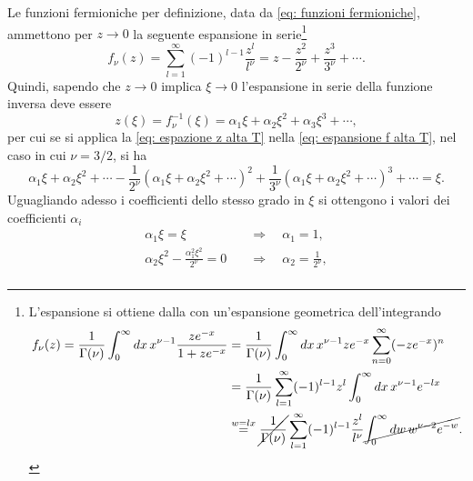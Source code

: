 \setcounter{caso}{0}
\begin{caso}
    Le funzioni fermioniche per definizione, data da \eqref{eq: funzioni fermioniche}, ammettono per $z \to 0$ la seguente espansione in serie\footnote{L'espansione si ottiene dalla con un'espansione geometrica dell'integrando 
    \begin{equation}
        \begin{split}
            f_\nu(z) = \frac{1}{\Gamma(\nu)}\int_0^\infty dx\,x^{\nu -1} \frac{ze^{-x}}{1 + ze^{-x}} &= \frac{1}{\Gamma(\nu)}\int_0^\infty dx\,x^{\nu -1}ze^{-x}\sum_{n=0}^\infty(-ze^{-x})^n \\
            &= \frac{1}{\Gamma(\nu)}\sum_{l=1}^\infty(-1)^{l-1}z^l\int_0^\infty dx\,x^{\nu-1}e^{-lx} \\
            &\overset{w = lx}{=} \cancel{\frac{1}{\Gamma(\nu)} }\sum_{l=1}^\infty(-1)^{l-1}\frac{z^l}{l^\nu}\cancel{\int_0^\infty dw\,w^{\nu - 2}e^{-w}}.
        \end{split}
    \end{equation}
    }
    \begin{equation}
    \label{eq: espansione f alta T}
        f_\nu(z) = \sum_{l = 1}^\infty(-1)^{l-1}\frac{z^l}{l^\nu} = z - \frac{z^2}{2^\nu} + \frac{z^3}{3^\nu} + \cdots.
    \end{equation}
    Quindi, sapendo che $z \to 0$ implica $\xi \to 0$ l'espansione in serie della funzione inversa deve essere
    \begin{equation}
    \label{eq: espazione z alta T}
        z(\xi) = f_\nu^{-1}(\xi) = \alpha_1 \xi + \alpha_2\xi^2 + \alpha_3 \xi^3 + \cdots,
    \end{equation}
    per cui se si applica la \eqref{eq: espazione z alta T} nella \eqref{eq: espansione f alta T}, nel caso in cui $\nu = 3/2$, si ha
    \begin{equation}
        \alpha_1 \xi + \alpha_2\xi^2  + \cdots - \frac{1}{2^\nu}(\alpha_1\xi + \alpha_2\xi^2 + \cdots)^2 + \frac{1}{3^\nu}(\alpha_1\xi + \alpha_2\xi^2 + \cdots)^3 + \cdots = \xi.
    \end{equation}
    Uguagliando adesso i coefficienti dello stesso grado in $\xi$ si ottengono i valori dei coefficienti $\alpha_i$
    \begin{align}
        \alpha_1\xi = \xi\quad&\Longrightarrow\quad \alpha_1 = 1, \\
        \alpha_2\xi^2 - \frac{\alpha_1^2\xi^2}{2^\nu} = 0\quad&\Longrightarrow\quad \alpha_2 = \frac{1}{2^\nu}, \\

\end{align}
\end{caso}

